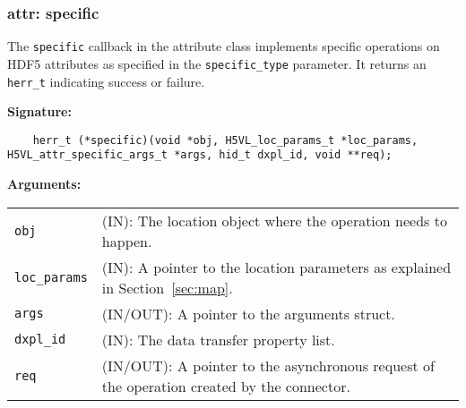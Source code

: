 \subsubsection{attr: specific}
The \texttt{specific} callback in the attribute class implements specific operations on HDF5 attributes as specified in the \texttt{specific\_type} parameter. It returns an \texttt{herr\_t} indicating success or failure.\bigskip

\begin{mdframed}[style=bgbox]
\textbf{Signature:}
\begin{lstlisting}
	herr_t (*specific)(void *obj, H5VL_loc_params_t *loc_params, H5VL_attr_specific_args_t *args, hid_t dxpl_id, void **req);
\end{lstlisting}

\textbf{Arguments:}\\
\begin{tabular}{l p{13.5cm}}
  \texttt{obj} & (IN): The location object  where the operation needs to happen.\\
  \texttt{loc\_params} & (IN): A pointer to the location parameters as explained in Section~\ref{sec:map}.\\
  \texttt{args} & (IN/OUT): A pointer to the arguments struct.\\
  \texttt{dxpl\_id} & (IN): The data transfer property list.\\
  \texttt{req} & (IN/OUT): A pointer to the asynchronous request of the
  operation created by the connector.\\
\end{tabular}
\end{mdframed}

